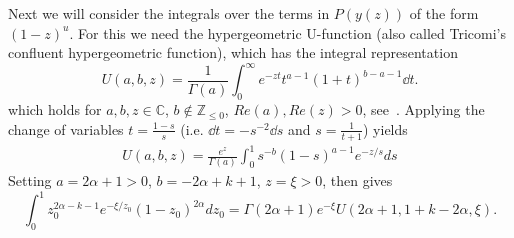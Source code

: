 Next we will consider the integrals over the terms in $P(y(z))$ of the form $(1-z)^u$. For this we need the 
hypergeometric U-function (also called Tricomi's confluent hypergeometric function), which has the integral representation 
\[
	U(a,b,z) = \frac{1}{\Gamma(a)} \int_0^\infty e^{-zt} t^{a-1} (1+t)^{b-a-1} \dd t.
\] 
which holds for $a,b,z\in \mathbb{C}$, $b \not \in \mathbb{Z}_{\leq 0}$, $Re(a), Re(z) >0$, see~\cite[p.255]{erdelyi1953higher}. 
Applying the change of variables $t=\frac{1-s}{s}$ (i.e. $\dd t = -s^{-2} \dd s$ and $s = \frac{1}{t+1}$) yields
\begin{align*}
	U(a,b,z) = \frac{e^z}{\Gamma(a)} \int_0^1 s^{-b} (1-s)^{a-1} e^{-z/s} ds
\end{align*}
Setting $a=2\alpha+1 >0$, $b=-2\alpha+k+1$, $z=\xi>0$, then gives
\begin{equation}\label{eq:integral_Delta_P_1_z}
	\int_0^1 z_0^{2\alpha-k-1} e^{-\xi/z_0} (1-z_0)^{2\alpha} dz_0 = \Gamma(2\alpha+1)e^{-\xi} U(2\alpha+1,1+k-2\alpha,\xi).
\end{equation}

